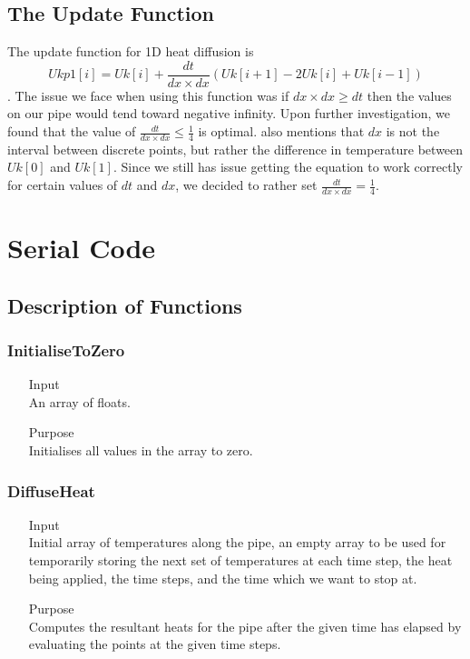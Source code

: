 \documentclass{article}
\begin{document}
\subsection{The Update Function}
The update function for 1D heat diffusion is $$Ukp1[i] = Uk[i] + \frac{dt}{dx \times dx}(Uk[i+1] - 2Uk[i] + Uk[i-1])$$.
The issue we face when using this function was if $dx \times dx \geq dt$ then the values on our pipe would tend toward negative infinity. Upon further investigation, we found that the value of $\frac{dt}{dx \times dx} \leq \frac{1}{4}$ is optimal. \citep{HeatDiff} also mentions that $dx$ is not the interval between discrete points, but rather the difference in temperature between $Uk[0]$ and $Uk[1]$. Since we still has issue getting the equation to work correctly for certain values of $dt$ and $dx$, we decided to rather set $\frac{dt}{dx \times dx} = \frac{1}{4}$.

\newpage
\section{Serial Code}
\subsection{Description of Functions}
\subsubsection{InitialiseToZero}
\begin{itemize}
	\item[Input] \hfill\\
	An array of floats.
	\item[Purpose] \hfill\\
	Initialises all values in the array to zero.
\end{itemize}

\subsubsection{DiffuseHeat}
\begin{itemize}
	\item[Input] \hfill\\
	Initial array of temperatures along the pipe, an empty array to be used for temporarily storing the next set of temperatures at each time step, the heat being applied, the time steps, and the time which we want to stop at.
	\item[Purpose] \hfill\\
	Computes the resultant heats for the pipe after the given time has elapsed by evaluating the points at the given time steps.
\end{itemize}
\end{document}
